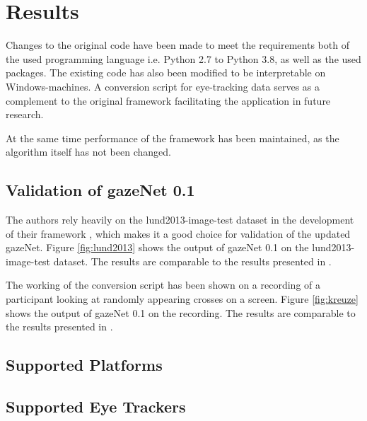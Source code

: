 \documentclass[acmlarge]{acmart}
\begin{document}
\section{Results}
Changes to the original code have been made to meet the requirements both of the used programming language i.e. Python 2.7 to Python 3.8, as well as the used packages. The existing code has also been modified to be interpretable on Windows-machines. A conversion script for eye-tracking data serves as a complement to the original framework facilitating the application in future research.

At the same time performance of the framework has been maintained, as the algorithm itself has not been changed.

\subsection{Validation of gazeNet 0.1}
The authors rely heavily on the lund2013-image-test dataset in the development of their framework \cite{zemblys2018gazeNet}, which makes it a good choice for validation of the updated gazeNet. Figure \ref{fig:lund2013} shows the output of gazeNet 0.1 on the lund2013-image-test dataset. The results are comparable to the results presented in \cite{zemblys2018gazeNet}.

The working of the conversion script has been shown on a recording of a participant looking at randomly appearing crosses on a screen. Figure \ref{fig:kreuze} shows the output of gazeNet 0.1 on the recording. The results are comparable to the results presented in \cite{zemblys2018gazeNet}.

\subsection{Supported Platforms}

\subsection{Supported Eye Trackers}
\end{document}
